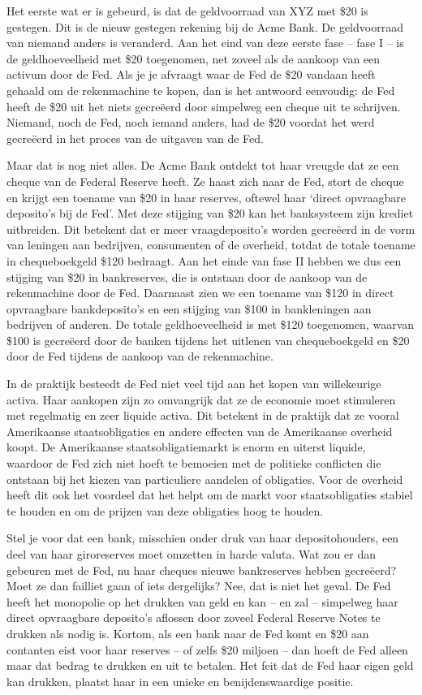 \documentclass[
  a5paper,
  smalldemyvopaper,10pt,twoside,onecolumn,openright,extrafontsizes,hidelinks]{memoir}
\begin{document}
Het eerste wat er is gebeurd, is dat de geldvoorraad van XYZ met \$20 is
gestegen. Dit is de nieuw gestegen rekening bij de Acme Bank. De
geldvoorraad van niemand anders is veranderd. Aan het eind van deze
eerste fase -- fase I -- is de geldhoeveelheid met \$20 toegenomen, net
zoveel als de aankoop van een activum door de Fed. Als je je afvraagt
waar de Fed de \$20 vandaan heeft gehaald om de rekenmachine te kopen,
dan is het antwoord eenvoudig: de Fed heeft de \$20 uit het niets
gecreëerd door simpelweg een cheque uit te schrijven. Niemand, noch de
Fed, noch iemand anders, had de \$20 voordat het werd gecreëerd in het
proces van de uitgaven van de Fed.

Maar dat is nog niet alles. De Acme Bank ontdekt tot haar vreugde dat ze
een cheque van de Federal Reserve heeft. Ze haast zich naar de Fed,
stort de cheque en krijgt een toename van \$20 in haar reserves, oftewel
haar `direct opvraagbare deposito's bij de Fed'. Met deze stijging van
\$20 kan het banksysteem zijn krediet uitbreiden. Dit betekent dat er
meer vraagdeposito's worden gecreëerd in de vorm van leningen aan
bedrijven, consumenten of de overheid, totdat de totale toename in
chequeboekgeld \$120 bedraagt. Aan het einde van fase II hebben we dus
een stijging van \$20 in bankreserves, die is ontstaan door de aankoop
van de rekenmachine door de Fed. Daarnaast zien we een toename van \$120
in direct opvraagbare bankdeposito's en een stijging van \$100 in
bankleningen aan bedrijven of anderen. De totale geldhoeveelheid is met
\$120 toegenomen, waarvan \$100 is gecreëerd door de banken tijdens het
uitlenen van chequeboekgeld en \$20 door de Fed tijdens de aankoop van
de rekenmachine.

In de praktijk besteedt de Fed niet veel tijd aan het kopen van
willekeurige activa. Haar aankopen zijn zo omvangrijk dat ze de economie
moet stimuleren met regelmatig en zeer liquide activa. Dit betekent in
de praktijk dat ze vooral Amerikaanse staatsobligaties en andere
effecten van de Amerikaanse overheid koopt. De Amerikaanse
staatsobligatiemarkt is enorm en uiterst liquide, waardoor de Fed zich
niet hoeft te bemoeien met de politieke conflicten die ontstaan bij het
kiezen van particuliere aandelen of obligaties. Voor de overheid heeft
dit ook het voordeel dat het helpt om de markt voor staatsobligaties
stabiel te houden en om de prijzen van deze obligaties hoog te houden.

Stel je voor dat een bank, misschien onder druk van haar
depositohouders, een deel van haar giroreserves moet omzetten in harde
valuta. Wat zou er dan gebeuren met de Fed, nu haar cheques nieuwe
bankreserves hebben gecreëerd? Moet ze dan failliet gaan of iets
dergelijks? Nee, dat is niet het geval. De Fed heeft het monopolie op
het drukken van geld en kan -- en zal -- simpelweg haar direct
opvraagbare deposito's aflossen door zoveel Federal Reserve Notes te
drukken als nodig is. Kortom, als een bank naar de Fed komt en \$20 aan
contanten eist voor haar reserves -- of zelfs \$20 miljoen -- dan hoeft
de Fed alleen maar dat bedrag te drukken en uit te betalen. Het feit dat
de Fed haar eigen geld kan drukken, plaatst haar in een unieke en
benijdenswaardige positie.
\end{document}
